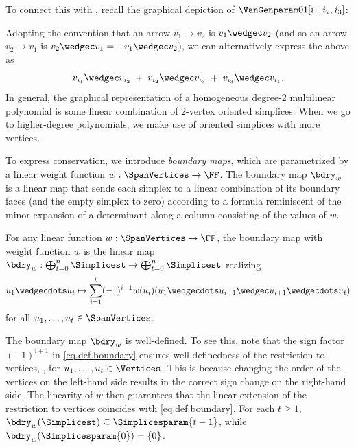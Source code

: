 To connect this with ,
recall the graphical depiction of
\(\VanGenparam01[{i_1}, {i_2}, {i_3}]\):
\begin{center}
\end{center}
Adopting the convention that an arrow \(v_1\to v_2\) is
\(v_1\wedgec v_2\)
(and so an arrow \(v_2\to v_1\) is
\(v_2\wedgec v_1 = -v_1\wedgec v_2\)),
we can alternatively express the above as
\[
  v_{i_1}\wedgec v_{i_2} \;+\; v_{i_2}\wedgec v_{i_3} \;+\; v_{i_3}\wedgec v_{i_1}.
\]
In general, the graphical representation of a homogeneous degree-2 multilinear
polynomial is some linear combination of 2-vertex oriented simplices.
When we go to higher-degree polynomials,
we make use of oriented simplices with more vertices.

To express conservation, we introduce \emph{boundary maps}, which are parametrized by a linear weight function \(w : \SpanVertices \to \FF\). The boundary map \(\bdry_w\) is a linear map that sends each simplex to a linear combination of its boundary faces (and the empty simplex to zero) according to a formula reminiscent of the minor expansion of a determinant along a column consisting of the values of $w$.
\begin{definition}
  \label{def.polybdry}
  For any linear function \(w : \SpanVertices \to\FF\),
  the boundary map with weight function \(w\) is the linear map 
  \(\bdry_w : \bigoplus_{t=0}^{n}\Simplicest \to \bigoplus_{t=0}^{n}\Simplicest\)
  realizing
  \begin{equation}\label{eq.def.boundary}
    u_1 \wedgecdots u_t
    \mapsto
      \sum_{i=1}^t (-1)^{i+1} w(u_i) 
      (u_1 \wedgecdots u_{i-1}\wedgec u_{i+1}\wedgecdots u_t)
  \end{equation}
  for all $u_1, \dots, u_t \in \SpanVertices$.
\end{definition}
The boundary map $\bdry_w$ is well-defined. To see this, note that the sign factor $(-1)^{i+1}$ in \eqref{eq.def.boundary} ensures well-definedness of the restriction to vertices, \ie, for $u_1, \dots, u_t \in \Vertices$. This is because changing the order of the vertices on the left-hand side results in the correct sign change on the right-hand side. The linearity of $w$ then guarantees that the linear extension of the restriction to vertices coincides with \eqref{eq.def.boundary}. 
For each \(t \ge 1\),
\(\bdry_w(\Simplicest) \subseteq \Simplicesparam{t-1}\),
while \(\bdry_w(\Simplicesparam{0}) = \{0\}\).

